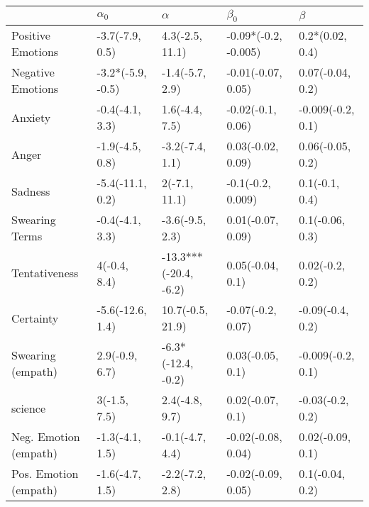 \begin{tabular}{lllll}
\toprule
{} &         $\alpha_0$ &               $\alpha$ &             $\beta_0$ &            $\beta$ \\
\midrule
Positive Emotions     &    -3.7(-7.9, 0.5) &        4.3(-2.5, 11.1) &  -0.09*(-0.2, -0.005) &    0.2*(0.02, 0.4) \\
Negative Emotions     &  -3.2*(-5.9, -0.5) &        -1.4(-5.7, 2.9) &    -0.01(-0.07, 0.05) &   0.07(-0.04, 0.2) \\
Anxiety               &    -0.4(-4.1, 3.3) &         1.6(-4.4, 7.5) &     -0.02(-0.1, 0.06) &  -0.009(-0.2, 0.1) \\
Anger                 &    -1.9(-4.5, 0.8) &        -3.2(-7.4, 1.1) &     0.03(-0.02, 0.09) &   0.06(-0.05, 0.2) \\
Sadness               &   -5.4(-11.1, 0.2) &          2(-7.1, 11.1) &     -0.1(-0.2, 0.009) &     0.1(-0.1, 0.4) \\
Swearing Terms        &    -0.4(-4.1, 3.3) &        -3.6(-9.5, 2.3) &     0.01(-0.07, 0.09) &    0.1(-0.06, 0.3) \\
Tentativeness         &       4(-0.4, 8.4) &  -13.3***(-20.4, -6.2) &      0.05(-0.04, 0.1) &    0.02(-0.2, 0.2) \\
Certainty             &   -5.6(-12.6, 1.4) &       10.7(-0.5, 21.9) &     -0.07(-0.2, 0.07) &   -0.09(-0.4, 0.2) \\
Swearing (empath)     &     2.9(-0.9, 6.7) &     -6.3*(-12.4, -0.2) &      0.03(-0.05, 0.1) &  -0.009(-0.2, 0.1) \\
science               &       3(-1.5, 7.5) &         2.4(-4.8, 9.7) &      0.02(-0.07, 0.1) &   -0.03(-0.2, 0.2) \\
Neg. Emotion (empath) &    -1.3(-4.1, 1.5) &        -0.1(-4.7, 4.4) &    -0.02(-0.08, 0.04) &   0.02(-0.09, 0.1) \\
Pos. Emotion (empath) &    -1.6(-4.7, 1.5) &        -2.2(-7.2, 2.8) &    -0.02(-0.09, 0.05) &    0.1(-0.04, 0.2) \\
\bottomrule
\end{tabular}
